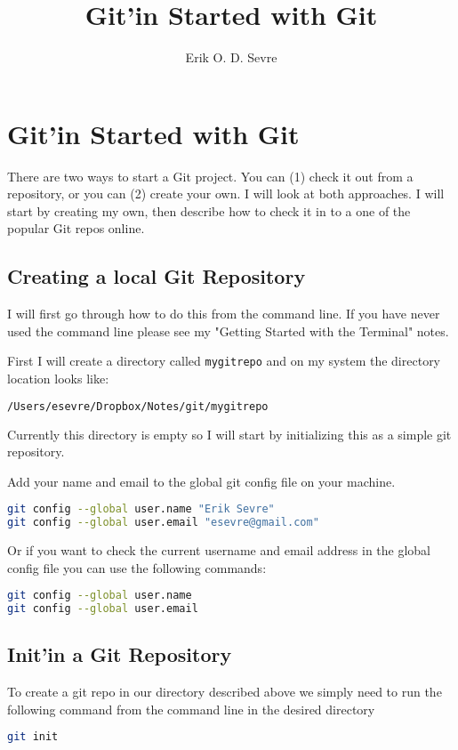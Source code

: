 \documentclass[a4paper]{spie} %
\author{Erik O. D. Sevre}
\title{Git'in Started with Git}
\begin{document}
\maketitle

\section*{Git'in Started with Git}

There are two ways to start a Git project. You can (1) check it out from a repository, or you can (2) create your own. I will look at both approaches. I will start by creating my own, then describe how to check it in to a one of the popular Git repos online.

\subsection*{Creating a local Git Repository}

I will first go through how to do this from the command line. If you have never used the command line please see my "Getting Started with the Terminal" notes.

First I will create a directory called \texttt{mygitrepo} and on my system the directory location looks like:
\begin{lstlisting}[language=bash]
/Users/esevre/Dropbox/Notes/git/mygitrepo
\end{lstlisting}

Currently this directory is empty so I will start by initializing this as a simple git repository.

Add your name and email to the global git config file on your machine.
\begin{lstlisting}[language=bash]
git config --global user.name "Erik Sevre"
git config --global user.email "esevre@gmail.com"
\end{lstlisting}

Or if you want to check the current username and email address in the global config file you can use the following commands:
\begin{lstlisting}[language=bash]
git config --global user.name
git config --global user.email
\end{lstlisting}


\subsection{Init'in a Git Repository}
To create a git repo in our directory described above we simply need to run the following command from the command line in the desired directory
\begin{lstlisting}[language=bash]
git init
\end{lstlisting}
\end{document}

